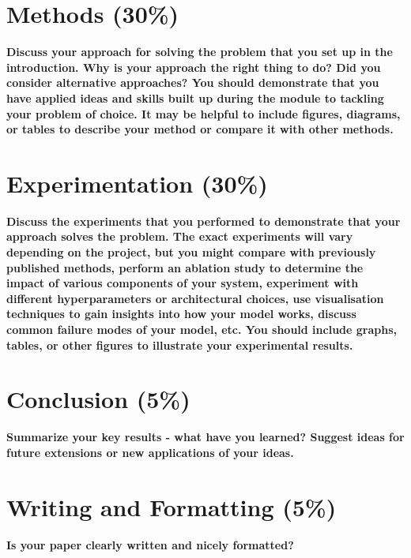 \documentclass{article}
\begin{document}
\section{Methods (30\%)}

\textbf{Discuss your approach for solving the problem that you set up in the introduction. Why is your approach the right thing to do? Did you consider alternative approaches? You should demonstrate that you have applied ideas and skills built up during the module to tackling your problem of choice. It may be helpful to include figures, diagrams, or tables to describe your method or compare it with other methods.}

\section{Experimentation (30\%)}

\textbf{Discuss the experiments that you performed to demonstrate that your approach solves the problem. The exact experiments will vary depending on the project, but you might compare with previously published methods, perform an ablation study to determine the impact of various components of your system, experiment with different hyperparameters or architectural choices, use visualisation techniques to gain insights into how your model works, discuss common failure modes of your model, etc. You should include graphs, tables, or other figures to illustrate your experimental results.}

\section{Conclusion (5\%)}

\textbf{Summarize your key results - what have you learned? Suggest ideas for future extensions or new applications of your ideas.}

\section{Writing and Formatting (5\%)}

\textbf{Is your paper clearly written and nicely formatted?}



 
\end{document}

